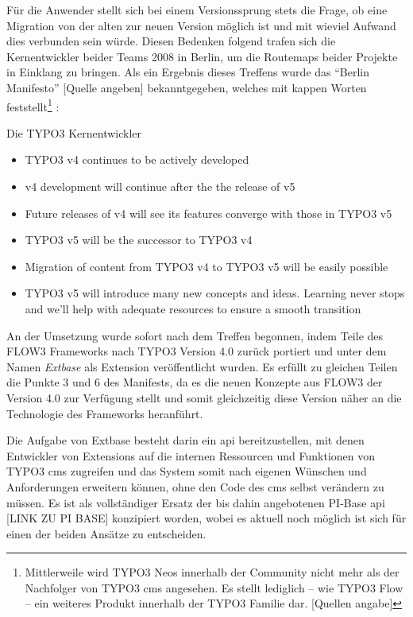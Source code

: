 Für die Anwender stellt sich bei einem Versionssprung stets die Frage, ob eine Migration von der alten zur neuen Version möglich ist und mit wieviel Aufwand dies verbunden sein würde. Diesen Bedenken folgend trafen sich die Kernentwickler beider Teams 2008 in Berlin, um die Routemaps beider Projekte in Einklang zu bringen. Als ein Ergebnis dieses Treffens wurde das ``Berlin Manifesto'' [Quelle angeben] bekanntgegeben, welches mit kappen Worten feststellt\footnote{Mittlerweile wird TYPO3 Neos innerhalb der Community nicht mehr als der Nachfolger von TYPO3 \gls{cms} angesehen. Es stellt lediglich – wie TYPO3 Flow – ein weiteres Produkt innerhalb der TYPO3 Familie dar. [Quellen angabe]}
:
\begin{shadequote}[l]{Die TYPO3 Kernentwickler}
	\begin{itemize}
		\item TYPO3 v4 continues to be actively developed
		\item v4 development will continue after the the release of v5
		\item Future releases of v4 will see its features converge with those in TYPO3 v5
		\item TYPO3 v5 will be the successor to TYPO3 v4
		\item Migration of content from TYPO3 v4 to TYPO3 v5 will be easily possible
		\item TYPO3 v5 will introduce many new concepts and ideas. Learning never stops and we'll help with adequate resources to ensure a smooth transition
	\end{itemize}
\end{shadequote}

An der Umsetzung wurde sofort nach dem Treffen begonnen, indem Teile des FLOW3 Frameworks nach TYPO3 Version 4.0 zurück portiert und unter dem Namen \emph{Extbase} als Extension veröffentlicht wurden. Es erfüllt zu gleichen Teilen die Punkte 3 und 6 des Manifests, da es die neuen Konzepte aus FLOW3 der Version 4.0 zur Verfügung stellt und somit gleichzeitig diese Version näher an die Technologie des Frameworks heranführt.

Die Aufgabe von Extbase besteht darin ein \gls{api} bereitzustellen, mit denen Entwickler von Extensions auf die internen Ressourcen und Funktionen von TYPO3 \gls{cms} zugreifen und das System somit nach eigenen Wünschen und Anforderungen erweitern können, ohne den Code des \gls{cms} selbst verändern zu müssen. Es ist als vollständiger Ersatz der bis dahin angebotenen PI-Base \gls{api} [LINK ZU PI BASE] konzipiert worden, wobei es aktuell noch möglich ist sich für einen der beiden Ansätze zu entscheiden.

